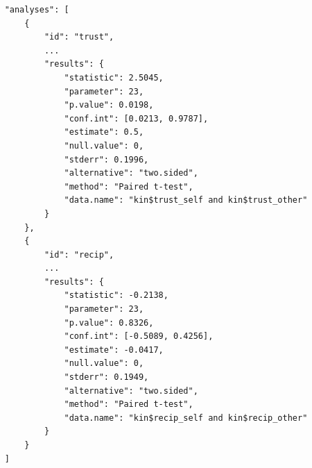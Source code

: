\documentclass[
  english,
  doc,floatsintext]{apa6}
\begin{document}
\begin{tcolorbox}[colback=black!5!white,colframe=white!5!black,title=Box 7. Results of data analysis.]
\begin{verbatim}
    "analyses": [
        {
            "id": "trust",
            ...
            "results": {
                "statistic": 2.5045,
                "parameter": 23,
                "p.value": 0.0198,
                "conf.int": [0.0213, 0.9787],
                "estimate": 0.5,
                "null.value": 0,
                "stderr": 0.1996,
                "alternative": "two.sided",
                "method": "Paired t-test",
                "data.name": "kin$trust_self and kin$trust_other"
            }
        },
        {
            "id": "recip",
            ...
            "results": {
                "statistic": -0.2138,
                "parameter": 23,
                "p.value": 0.8326,
                "conf.int": [-0.5089, 0.4256],
                "estimate": -0.0417,
                "null.value": 0,
                "stderr": 0.1949,
                "alternative": "two.sided",
                "method": "Paired t-test",
                "data.name": "kin$recip_self and kin$recip_other"
            }
        }
    ]
\end{verbatim}
\end{tcolorbox}
\end{document}
